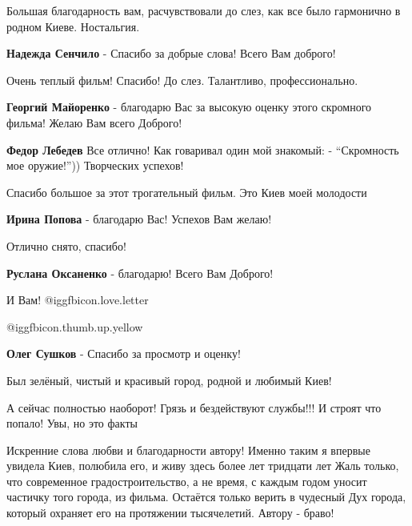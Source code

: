 \begin{itemize}
Большая благодарность вам, расчувствовали до слез, как все было гармонично в
родном Киеве. Ностальгия.

\textbf{Надежда Сенчило} - Спасибо за добрые слова! Всего Вам доброго!

Очень теплый фильм! Спасибо! До слез. Талантливо, профессионально.

\begin{itemize} %
\textbf{Георгий Майоренко} - благодарю Вас за высокую оценку этого скромного фильма! Желаю Вам всего Доброго!

\textbf{Федор Лебедев} Все отлично! Как говаривал один мой знакомый: - \enquote{Скромность мое оружие!})) Творческих успехов!
\end{itemize} %

Спасибо большое за этот трогательный фильм. Это Киев моей молодости

\textbf{Ирина Попова} - благодарю Вас! Успехов Вам желаю!

Отлично снято, спасибо!

\textbf{Руслана Оксаненко} - благодарю! Всего Вам Доброго!

И Вам!  @igg{fbicon.love.letter} 

 @igg{fbicon.thumb.up.yellow} 

\begin{itemize} %
\textbf{Олег Сушков} - Спасибо за просмотр и оценку!


Был зелёный, чистый и красивый город, родной и любимый Киев!

А сейчас полностью наоборот! Грязь и бездействуют службы!!! И строят что
попало! Увы, но это факты

\end{itemize} %


Искренние слова любви и благодарности автору! Именно таким я впервые увидела
Киев, полюбила его, и живу здесь более лет тридцати лет Жаль только, что
современное градостроительство, а не время, с каждым годом уносит частичку того
города, из фильма. Остаётся только верить в чудесный Дух города, который
охраняет его на протяжении тысячелетий. Автору - браво!


\end{itemize}
